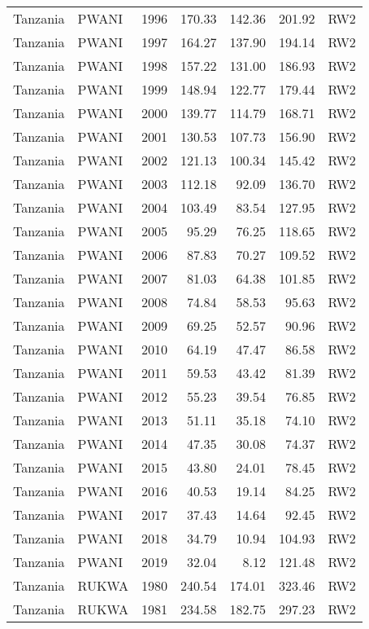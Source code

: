 \begin{longtable}{lllrrrl}
  Tanzania & PWANI & 1996 & 170.33 & 142.36 & 201.92 & RW2 \\ 
  Tanzania & PWANI & 1997 & 164.27 & 137.90 & 194.14 & RW2 \\ 
  Tanzania & PWANI & 1998 & 157.22 & 131.00 & 186.93 & RW2 \\ 
  Tanzania & PWANI & 1999 & 148.94 & 122.77 & 179.44 & RW2 \\ 
  Tanzania & PWANI & 2000 & 139.77 & 114.79 & 168.71 & RW2 \\ 
  Tanzania & PWANI & 2001 & 130.53 & 107.73 & 156.90 & RW2 \\ 
  Tanzania & PWANI & 2002 & 121.13 & 100.34 & 145.42 & RW2 \\ 
  Tanzania & PWANI & 2003 & 112.18 & 92.09 & 136.70 & RW2 \\ 
  Tanzania & PWANI & 2004 & 103.49 & 83.54 & 127.95 & RW2 \\ 
  Tanzania & PWANI & 2005 & 95.29 & 76.25 & 118.65 & RW2 \\ 
  Tanzania & PWANI & 2006 & 87.83 & 70.27 & 109.52 & RW2 \\ 
  Tanzania & PWANI & 2007 & 81.03 & 64.38 & 101.85 & RW2 \\ 
  Tanzania & PWANI & 2008 & 74.84 & 58.53 & 95.63 & RW2 \\ 
  Tanzania & PWANI & 2009 & 69.25 & 52.57 & 90.96 & RW2 \\ 
  Tanzania & PWANI & 2010 & 64.19 & 47.47 & 86.58 & RW2 \\ 
  Tanzania & PWANI & 2011 & 59.53 & 43.42 & 81.39 & RW2 \\ 
  Tanzania & PWANI & 2012 & 55.23 & 39.54 & 76.85 & RW2 \\ 
  Tanzania & PWANI & 2013 & 51.11 & 35.18 & 74.10 & RW2 \\ 
  Tanzania & PWANI & 2014 & 47.35 & 30.08 & 74.37 & RW2 \\ 
  Tanzania & PWANI & 2015 & 43.80 & 24.01 & 78.45 & RW2 \\ 
  Tanzania & PWANI & 2016 & 40.53 & 19.14 & 84.25 & RW2 \\ 
  Tanzania & PWANI & 2017 & 37.43 & 14.64 & 92.45 & RW2 \\ 
  Tanzania & PWANI & 2018 & 34.79 & 10.94 & 104.93 & RW2 \\ 
  Tanzania & PWANI & 2019 & 32.04 & 8.12 & 121.48 & RW2 \\ 
  Tanzania & RUKWA & 1980 & 240.54 & 174.01 & 323.46 & RW2 \\ 
  Tanzania & RUKWA & 1981 & 234.58 & 182.75 & 297.23 & RW2 \\ 

\end{longtable}
